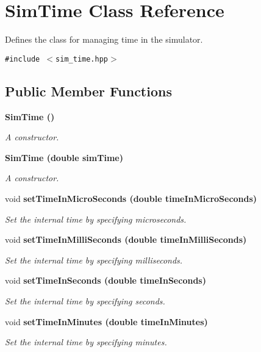 \section{Sim\-Time Class Reference}
\label{classSimTime}
Defines the class for managing time in the simulator.  


{\tt \#include $<$sim\_\-time.hpp$>$}

\subsection*{Public Member Functions}
\begin{CompactItemize}
\item 
\bf{Sim\-Time} ()
\begin{CompactList}\small\item\em A constructor. \item\end{CompactList}\item 
\bf{Sim\-Time} (double sim\-Time)
\begin{CompactList}\small\item\em A constructor. \item\end{CompactList}\item 
void \bf{set\-Time\-In\-Micro\-Seconds} (double time\-In\-Micro\-Seconds)
\begin{CompactList}\small\item\em Set the internal time by specifying microseconds. \item\end{CompactList}\item 
void \bf{set\-Time\-In\-Milli\-Seconds} (double time\-In\-Milli\-Seconds)
\begin{CompactList}\small\item\em Set the internal time by specifying milliseconds. \item\end{CompactList}\item 
void \bf{set\-Time\-In\-Seconds} (double time\-In\-Seconds)
\begin{CompactList}\small\item\em Set the internal time by specifying seconds. \item\end{CompactList}\item 
void \bf{set\-Time\-In\-Minutes} (double time\-In\-Minutes)
\begin{CompactList}\small\item\em Set the internal time by specifying minutes. \item\end{CompactList}\item 

\end{CompactItemize}
